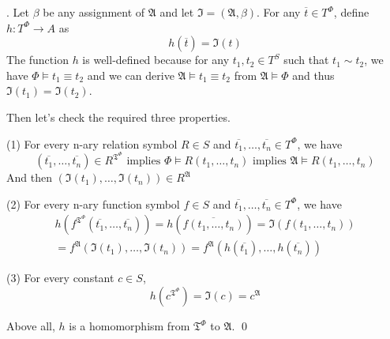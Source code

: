 \documentclass[10pt,a4paper]{article}
\newenvironment{sol}[1]
{\par\vspace{3mm}\noindent{\it Solution #1}.}
{\qed}
\newcommand{\fA}{\mathfrak{A}}
\newcommand{\fI}{\mathfrak{I}}
\newcommand{\fT}{\mathfrak{T}}
\begin{document}
	\begin{sol}{6.2} %
		Let $\beta$ be any assignment of $\mathfrak{A}$ and let $\mathfrak{I} = (\mathfrak{A}, \beta)$. For any $\overline{t} \in T^{\Phi}$, define $h:T^{\Phi}\rightarrow A$ as
		$$
			h(\overline{t}) = \mathfrak{I}(t)
		$$
		The function $h$ is well-defined because for any $t_1, t_2 \in T^S$ such that $t_1 \sim t_2$, we have $\Phi \models t_1 \equiv t_2$ and we can derive $\mathfrak{A} \models t_1 \equiv t_2$ from $\mathfrak{A} \models \Phi$ and thus $\mathfrak{I}(t_1) = \mathfrak{I}(t_2)$.
		
		Then let's check the required three properties.
		
		(1) For every n-ary relation symbol $R \in S$ and $\overline{t_1}, \dots, \overline{t_n} \in T^\Phi$, we have
		$$
			(\overline{t_1},\dots,\overline{t_n}) \in R^{\fT^\Phi} \text{ implies } \Phi \models R(t_1,\dots,t_n) \text{ implies } \mathfrak{A} \models R(t_1,\dots,t_n)
		$$
		And then $(\mathfrak{I}(t_1),\dots,\mathfrak{I}(t_n)) \in R^{\mathfrak{A}}$
		
		(2) For every n-ary function symbol $f \in S$ and $\overline{t_1}, \dots, \overline{t_n} \in T^\Phi$, we have
		\begin{align} 
			h(f^{\fT^\Phi}(\overline{t_1}, \dots, \overline{t_n})) 
			= h(\overline{f(t_1,\dots,t_n)})  = \fI(f(t_1,\dots,t_n)) \\
			= f^\fA(\fI(t_1),\dots,\fI(t_n)) = f^\fA(h(\overline{t_1}),\dots,h(\overline{t_n}))
		\end{align} 
		
		(3) For every constant $c \in S$, 
		$$
			h(c^{\fT^\Phi}) = \fI(c) = c^\fA 
		$$
		
		Above all, $h$ is a homomorphism from $\fT^\Phi$ to $\fA$.
	\end{sol} 
\end{document}
